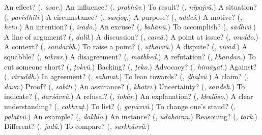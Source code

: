 \begin{tcolorbox}[breakable,colback=teal!4,colframe=teal!35!black,title={Before you move on}]
An effect? (\textbf{}, \emph{asar}.) An influence? (\textbf{}, \emph{prabhāv}.) To result? (\textbf{}, \emph{nīpajvũ}.) A situation? (\textbf{}, \emph{paristhiti}.) A circumstance? (\textbf{}, \emph{sanjog}.) A purpose? (\textbf{}, \emph{uddeś}.) A motive? (\textbf{}, \emph{hetu}.) An intention? (\textbf{}, \emph{irādo}.) An excuse? (\textbf{}, \emph{bahānũ}.) To accomplish? (\textbf{}, \emph{sādhvũ}.) A line of argument? (\textbf{}, \emph{dalīl}.) A discussion? (\textbf{}, \emph{carcā}.) A point at issue? (\textbf{}, \emph{muddo}.) A context? (\textbf{}, \emph{sandarbh}.) To raise a point? (\textbf{}, \emph{uṭhāvvũ}.) A dispute? (\textbf{}, \emph{vivād}.) A squabble? (\textbf{}, \emph{takrār}.) A disagreement? (\textbf{}, \emph{matbhed}.) A refutation? (\textbf{}, \emph{khanḍan}.) To cut someone short? (\textbf{}, \emph{ṭokvũ}.) Backing? (\textbf{}, \emph{ṭeko}.) Advocacy? (\textbf{}, \emph{himāyat}.) Against? (\textbf{}, \emph{viruddh}.) In agreement? (\textbf{}, \emph{sahmat}.) To lean towards? (\textbf{}, \emph{ḍhaḷvũ}.) A claim? (\textbf{}, \emph{dāvo}.) Proof? (\textbf{}, \emph{sābitī}.) An assurance? (\textbf{}, \emph{khātrī}.) Uncertainty? (\textbf{}, \emph{sandeh}.) To indicate? (\textbf{}, \emph{darśāvvũ}.) A refusal? (\textbf{}, \emph{inkār}.) An explanation? (\textbf{}, \emph{khulāso}.) A clear understanding? (\textbf{}, \emph{cokhvaṭ}.) To list? (\textbf{}, \emph{gaṇāvvũ}.) To change one's stand? (\textbf{}, \emph{palaṭvũ}.) An example? (\textbf{}, \emph{dākhlo}.) An instance? (\textbf{}, \emph{udāharaṇ}.) Reasoning? (\textbf{}, \emph{tark}.) Different? (\textbf{}, \emph{judũ}.) To compare? (\textbf{}, \emph{sarkhāvvũ}.)
\end{tcolorbox}
